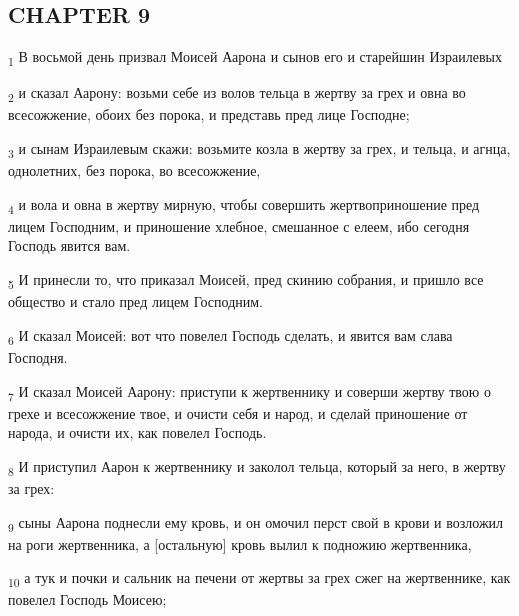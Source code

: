 \subsection{CHAPTER 9}
\begin{tcolorbox}
\textsubscript{1} В восьмой день призвал Моисей Аарона и сынов его и старейшин Израилевых
\end{tcolorbox}
\begin{tcolorbox}
\textsubscript{2} и сказал Аарону: возьми себе из волов тельца в жертву за грех и овна во всесожжение, обоих без порока, и представь пред лице Господне;
\end{tcolorbox}
\begin{tcolorbox}
\textsubscript{3} и сынам Израилевым скажи: возьмите козла в жертву за грех, и тельца, и агнца, однолетних, без порока, во всесожжение,
\end{tcolorbox}
\begin{tcolorbox}
\textsubscript{4} и вола и овна в жертву мирную, чтобы совершить жертвоприношение пред лицем Господним, и приношение хлебное, смешанное с елеем, ибо сегодня Господь явится вам.
\end{tcolorbox}
\begin{tcolorbox}
\textsubscript{5} И принесли то, что приказал Моисей, пред скинию собрания, и пришло все общество и стало пред лицем Господним.
\end{tcolorbox}
\begin{tcolorbox}
\textsubscript{6} И сказал Моисей: вот что повелел Господь сделать, и явится вам слава Господня.
\end{tcolorbox}
\begin{tcolorbox}
\textsubscript{7} И сказал Моисей Аарону: приступи к жертвеннику и соверши жертву твою о грехе и всесожжение твое, и очисти себя и народ, и сделай приношение от народа, и очисти их, как повелел Господь.
\end{tcolorbox}
\begin{tcolorbox}
\textsubscript{8} И приступил Аарон к жертвеннику и заколол тельца, который за него, в жертву за грех:
\end{tcolorbox}
\begin{tcolorbox}
\textsubscript{9} сыны Аарона поднесли ему кровь, и он омочил перст свой в крови и возложил на роги жертвенника, а [остальную] кровь вылил к подножию жертвенника,
\end{tcolorbox}
\begin{tcolorbox}
\textsubscript{10} а тук и почки и сальник на печени от жертвы за грех сжег на жертвеннике, как повелел Господь Моисею;
\end{tcolorbox}
